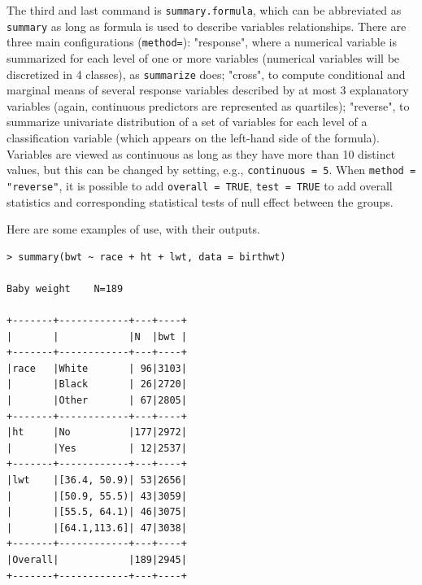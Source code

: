 \documentclass[a4paper,twoside]{book}
\newcounter{fig}
\renewcommand{\texttt}[1]{\lstinline{#1}}
\begin{document}
The third and last command is \texttt{summary.formula}, which can be
abbreviated as \texttt{summary} as long as formula is used to describe
variables relationships. There are three main configurations
(\texttt{method=}): "response", where a numerical variable is summarized for
each level of one or more variables (numerical variables will be discretized
in 4 classes), as \texttt{summarize} does; "cross", to compute conditional
and marginal means of several response variables described by at most 3
explanatory variables (again, continuous predictors are represented as
quartiles); "reverse", to summarize univariate distribution of a set of
variables for each level of a classification variable (which appears on the
left-hand side of the formula). Variables are viewed as continuous as long
as they have more than 10 distinct values, but this can be changed by
setting, e.g., \texttt{continuous = 5}. When \texttt{method = "reverse"}, it
is possible to add \texttt{overall = TRUE}, \texttt{test = TRUE} to add
overall statistics and corresponding statistical tests of null effect
between the groups.

Here are some examples of use, with their outputs.

\begin{verbatim}
> summary(bwt ~ race + ht + lwt, data = birthwt)

Baby weight    N=189

+-------+------------+---+----+
|       |            |N  |bwt |
+-------+------------+---+----+
|race   |White       | 96|3103|
|       |Black       | 26|2720|
|       |Other       | 67|2805|
+-------+------------+---+----+
|ht     |No          |177|2972|
|       |Yes         | 12|2537|
+-------+------------+---+----+
|lwt    |[36.4, 50.9)| 53|2656|
|       |[50.9, 55.5)| 43|3059|
|       |[55.5, 64.1)| 46|3075|
|       |[64.1,113.6]| 47|3038|
+-------+------------+---+----+
|Overall|            |189|2945|
+-------+------------+---+----+
\end{verbatim}
\end{document}
